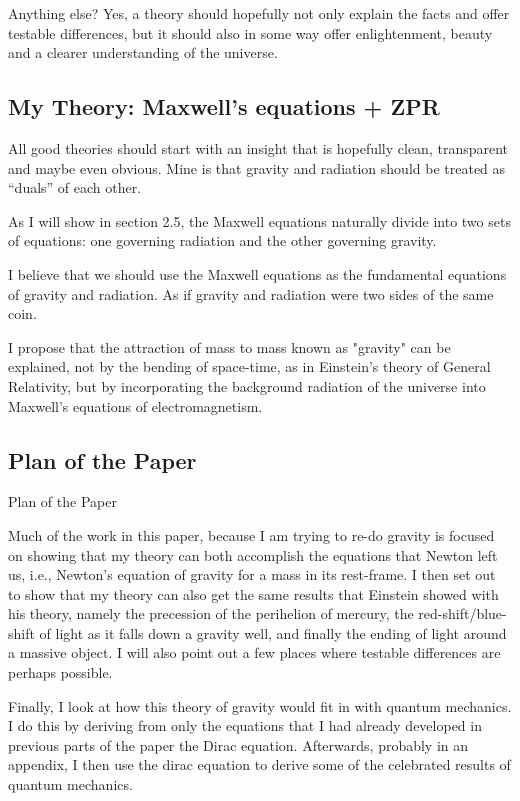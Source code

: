 \documentclass {article}
\begin{document}
		Anything else? Yes, a theory should hopefully not only explain the facts and offer testable differences, but it should also in some way offer enlightenment, beauty and a clearer understanding of the universe. 
		
\subsection{My Theory: Maxwell's equations  + ZPR}

All good theories should start with an insight that is hopefully clean, transparent and maybe even obvious. Mine is that gravity and radiation should be treated as “duals” of each other.

As I will show in section 2.5, the Maxwell equations naturally divide into two sets of equations: one governing radiation and the other governing gravity. 

I believe that we should use the Maxwell equations as the fundamental equations of gravity and radiation. As if gravity and radiation were two sides of the same coin. 

I propose that the attraction of mass to mass known as "gravity" can be explained, not by the bending of space-time, as in Einstein's theory of General Relativity, but by incorporating the background radiation of the universe into Maxwell's equations of electromagnetism.

\subsection{Plan of the Paper}
Plan of the Paper

Much of the work in this paper, because I am trying to re-do gravity is focused on showing that my theory can both accomplish the equations that Newton left us, i.e., Newton’s equation of gravity for a mass in its rest-frame. I then set out to show that my theory can also get the same results that Einstein showed with his theory, namely the precession of the perihelion of mercury, the red-shift/blue-shift of light as it falls down a gravity well, and finally the ending of light around a massive object. I will also point out a few places where testable differences are perhaps possible.

Finally, I look at how this theory of gravity would fit in with quantum mechanics. I do this by deriving from only the equations that I had already developed in previous parts of the paper the Dirac equation. Afterwards, probably in an appendix, I then use the dirac equation to derive some of the celebrated results of quantum mechanics.
\end{document}
